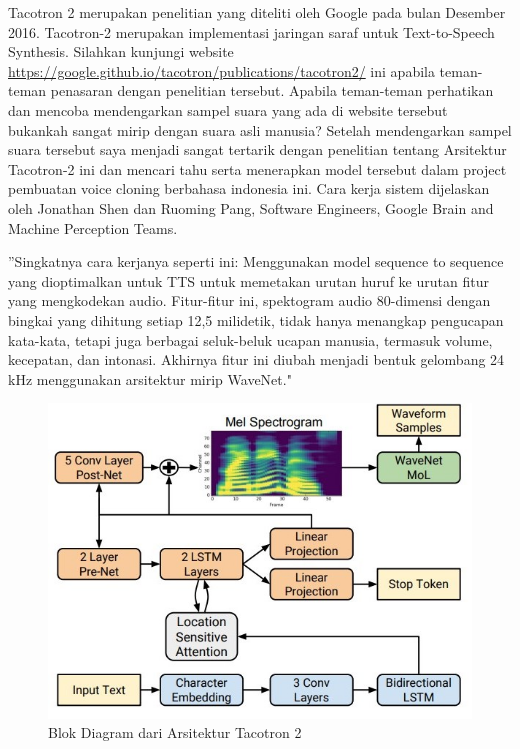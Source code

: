 Tacotron 2 merupakan penelitian yang diteliti oleh Google pada bulan Desember 2016. Tacotron-2 merupakan implementasi jaringan saraf untuk Text-to-Speech Synthesis. Silahkan kunjungi website \url{https://google.github.io/tacotron/publications/tacotron2/} ini apabila teman-teman penasaran dengan penelitian tersebut. Apabila teman-teman perhatikan dan mencoba mendengarkan sampel suara yang ada di website tersebut bukankah sangat mirip dengan suara asli manusia? Setelah mendengarkan sampel suara tersebut saya menjadi sangat tertarik dengan penelitian tentang Arsitektur Tacotron-2 ini dan mencari tahu serta menerapkan model tersebut dalam project pembuatan voice cloning berbahasa indonesia ini. Cara kerja sistem dijelaskan oleh Jonathan Shen dan Ruoming Pang, Software Engineers, Google Brain and Machine Perception Teams\cite{DBLP:journals/corr/abs-1712-05884}.

''Singkatnya cara kerjanya seperti ini: Menggunakan model sequence to sequence yang dioptimalkan untuk TTS untuk memetakan urutan huruf ke urutan fitur yang mengkodekan audio. Fitur-fitur ini, spektogram audio 80-dimensi dengan bingkai yang dihitung setiap 12,5 milidetik, tidak hanya menangkap pengucapan kata-kata, tetapi juga berbagai seluk-beluk ucapan manusia, termasuk volume, kecepatan, dan intonasi. Akhirnya fitur ini diubah menjadi bentuk gelombang 24 kHz menggunakan arsitektur mirip WaveNet."

\begin{figure}[H]
        \centerline{\includegraphics[scale=.5]{figures/fig1}}
        \caption{Blok Diagram dari Arsitektur Tacotron 2}
		\label{fig1}
\end{figure}

